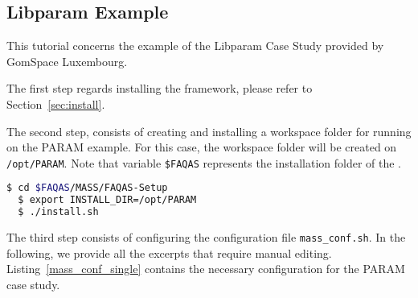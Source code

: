 
\newpage
\subsection{Libparam Example}
\label{sec:single_machine_libparam}

This tutorial concerns the example of the Libparam Case Study provided by GomSpace Luxembourg.

The first step regards installing the \MASS framework, please refer to Section~\ref{sec:install}.

The second step, consists of creating and installing a workspace folder for running \MASS on the PARAM example. For this case, the workspace folder will be created on \texttt{/opt/PARAM}. Note that variable \texttt{\$FAQAS} represents the installation folder of the \FAQAS.

\begin{lstlisting}[language=bash]
  $ cd $FAQAS/MASS/FAQAS-Setup
  $ export INSTALL_DIR=/opt/PARAM
  $ ./install.sh
\end{lstlisting}

The third step consists of configuring the \MASS configuration file \texttt{mass\_conf.sh}. In the following, we provide
all the excerpts that require manual editing.
 Listing~\ref{mass_conf_single} contains the necessary configuration for the PARAM case study.

